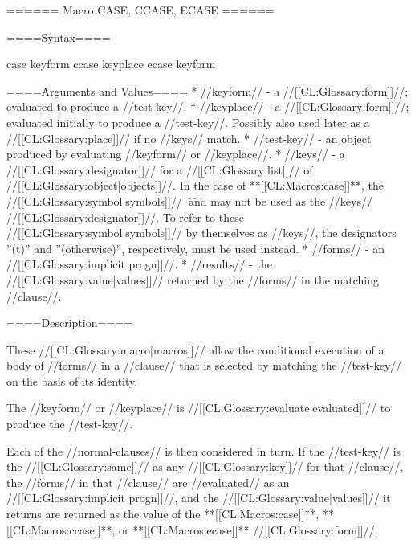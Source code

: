 ====== Macro CASE, CCASE, ECASE ======

====Syntax====

\DefmacWithValues case {keyform  } {} \DefmacWithValues ccase {keyplace } {} \DefmacWithValues ecase {keyform } {}

   

====Arguments and Values====
  * //keyform// - a //[[CL:Glossary:form]]//; evaluated to produce a //test-key//.
  * //keyplace// - a //[[CL:Glossary:form]]//; evaluated initially to produce a //test-key//. Possibly also used later as a //[[CL:Glossary:place]]// if no //keys// match.
  * //test-key// - an object produced by evaluating //keyform// or //keyplace//.
  * //keys// - a //[[CL:Glossary:designator]]// for a //[[CL:Glossary:list]]// of //[[CL:Glossary:object|objects]]//. In the case of **[[CL:Macros:case]]**, the //[[CL:Glossary:symbol|symbols]]// \t\ and  may not be used as the //keys// //[[CL:Glossary:designator]]//. To refer to these //[[CL:Glossary:symbol|symbols]]// by themselves as //keys//, the designators ''(t)'' and ''(otherwise)'', respectively, must be used instead.
  * //forms// - an //[[CL:Glossary:implicit progn]]//.
  * //results// - the //[[CL:Glossary:value|values]]// returned by the //forms// in the matching //clause//.

====Description====

These //[[CL:Glossary:macro|macros]]// allow the conditional execution of a body of //forms// in a //clause// that is selected by matching the //test-key// on the basis of its identity.

The //keyform// or //keyplace// is //[[CL:Glossary:evaluate|evaluated]]// to produce the //test-key//.

Each of the //normal-clauses// is then considered in turn. If the //test-key// is the //[[CL:Glossary:same]]// as any //[[CL:Glossary:key]]// for that //clause//, the //forms// in that //clause// are //evaluated// as an //[[CL:Glossary:implicit progn]]//, and the //[[CL:Glossary:value|values]]// it returns are returned as the value of the **[[CL:Macros:case]]**, **[[CL:Macros:ccase]]**, or **[[CL:Macros:ecase]]** //[[CL:Glossary:form]]//.

